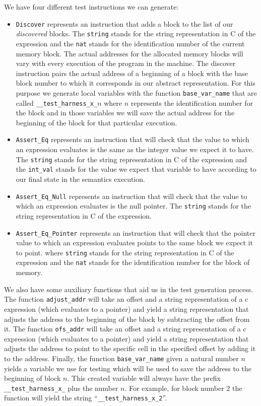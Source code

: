 We have four different test instructions we can generate:

\begin{itemize}
  \item{\verb|Discover| represents an instruction that adds a block to the list of our \textit{discovered} blocks.
  The \verb|string| stands for the string representation in C of the expression and the \verb|nat| stands for the identification number of the current memory block.
  The actual addresses for the allocated memory blocks will vary with every execution of the program in the machine.
  The discover instruction pairs the actual address of a beginning of a block with the base block number to which it corresponds in our abstract representation.
  For this purpose we generate local variables with the function \verb|base_var_name| that are called \verb|__test_harness_x_|$n$ where $n$ represents the identification number for the block and in those variables we will save the actual address for the beginning of the block for that particular execution.}
  \item{\verb|Assert_Eq| represents an instruction that will check that the value to which an expression evaluates is the same as the integer value we expect it to have.
  The \verb|string| stands for the string representation in C of the expression and the \verb|int_val| stands for the value we expect that variable to have according to our final state in the semantics execution.}
  \item{\verb|Assert_Eq_Null| represents an instruction that will check that the value to which an expression evaluates is the null pointer.
  The \verb|string| stands for the string representation in C of the expression.}
  \item{\verb|Assert_Eq_Pointer| represents an instruction that will check that the pointer value to which an expression evaluates points to the same block we expect it to point.
  where \verb|string| stands for the string representation in C of the expression and the \verb|nat| stands for the identification number for the block of memory.}
\end{itemize}

We also have some auxiliary functions that aid us in the test generation process.
The function \verb|adjust_addr| will take an offset and a string representation of a c expression (which evaluates to a pointer) and yield a string representation that adjusts the address to the beginning of the block by subtracting the offset from it.
The function \verb|ofs_addr| will take an offset and a string representation of a c expression (which evaluates to a pointer) and yield a string representation that adjusts the address to point to the specific cell in the specified offset by adding it to the address.
Finally, the function \verb|base_var_name| given a natural number $n$ yields a variable we use for testing which will be used to save the address to the beginning of block $n$.
This created variable will always have the prefix \verb|__test_harness_x_| plus the number $n$.
For example, for block number $2$ the function will yield the string ``\verb|__test_harness_x_2|''.


